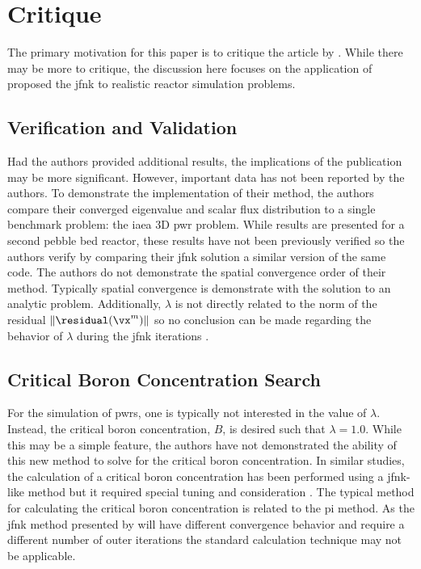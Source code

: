 \section{Critique}
\label{sec:critique}
  The primary motivation for this paper is to critique the article by
  \citeauthor{qe2paper}. While there may be more to critique, the discussion
  here focuses on the application of proposed the \gls{jfnk} to realistic
  reactor simulation problems.

  \subsection{Verification and Validation}
    Had the authors provided additional results, the implications of the
    publication may be more significant. However, important data has not been
    reported by the authors. To demonstrate the implementation of their method,
    the authors compare their converged eigenvalue and scalar flux distribution 
    to a single benchmark problem: the \gls{iaea} 3D \gls{pwr} problem. While
    results are presented for a second pebble bed reactor, these results have
    not been previously verified so the authors verify by comparing their
    \gls{jfnk} solution a similar version of the same code. The authors do not
    demonstrate the spatial convergence order of their method. Typically spatial
    convergence is demonstrate with the solution to an analytic problem.
    Additionally, $\lambda$ is not directly related to the norm of the residual
    $\| \residual (\vx^m) \|$ so no conclusion can be made regarding the
    behavior of $\lambda$ during the \gls{jfnk} iterations \cite{caslJFNK}.

  \subsection{Critical Boron Concentration Search}
    For the simulation of \glspl{pwr}, one is typically not interested in the
    value of $\lambda$. Instead, the critical boron concentration, $B$, is
    desired such that $\lambda=1.0$. While this may be a simple feature, the
    authors have not demonstrated the ability of this new method to solve for
    the critical boron concentration. In similar studies, the calculation of a
    critical boron concentration has been performed using a \gls{jfnk}-like
    method but it required special tuning and consideration \cite{caslJFNK}. The
    typical method for calculating the critical boron concentration is related
    to the \gls{pi} method. As the \gls{jfnk} method presented by
    \citeauthor{qe2paper} will have different convergence behavior and require a
    different number of outer iterations the standard calculation technique may
    not be applicable.

